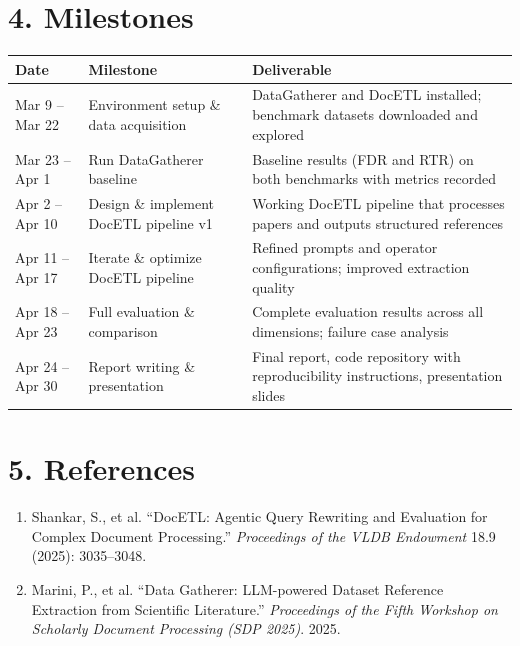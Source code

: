 \documentclass[11pt]{article}
\begin{document}
\section{4. Milestones}

\noindent
\begin{tabularx}{\textwidth}{lp{3.8cm}X}
\toprule
\textbf{Date} & \textbf{Milestone} & \textbf{Deliverable} \\
\midrule
Mar 9 -- Mar 22 & Environment setup \& data acquisition & DataGatherer and DocETL installed; benchmark datasets downloaded and explored \\
Mar 23 -- Apr 1 & Run DataGatherer baseline & Baseline results (FDR and RTR) on both benchmarks with metrics recorded \\
Apr 2 -- Apr 10 & Design \& implement DocETL pipeline v1 & Working DocETL pipeline that processes papers and outputs structured references \\
Apr 11 -- Apr 17 & Iterate \& optimize DocETL pipeline & Refined prompts and operator configurations; improved extraction quality \\
Apr 18 -- Apr 23 & Full evaluation \& comparison & Complete evaluation results across all dimensions; failure case analysis \\
Apr 24 -- Apr 30 & Report writing \& presentation & Final report, code repository with reproducibility instructions, presentation slides \\
\bottomrule
\end{tabularx}

\section{5. References}

\begin{enumerate}[nosep]
    \item Shankar, S., et al. ``DocETL: Agentic Query Rewriting and Evaluation for Complex Document Processing.'' \textit{Proceedings of the VLDB Endowment} 18.9 (2025): 3035--3048.
    \item Marini, P., et al. ``Data Gatherer: LLM-powered Dataset Reference Extraction from Scientific Literature.'' \textit{Proceedings of the Fifth Workshop on Scholarly Document Processing (SDP 2025)}. 2025.
\end{enumerate}
\end{document}
